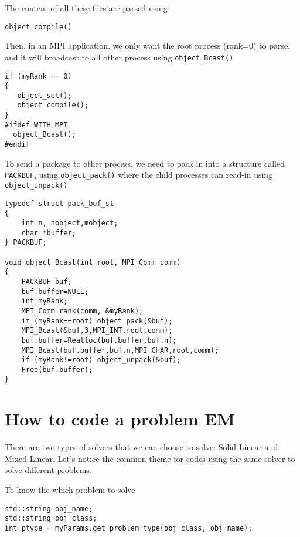 The content of all these files are parsed using
\begin{verbatim}
object_compile()
\end{verbatim}
Then, in an MPI application, we only want the root process (rank=0) to parse,
and it will broadcast to all other process using \verb!object_Bcast()!
\begin{verbatim}
if (myRank == 0)
{
   object_set();
   object_compile();
}
#ifdef WITH_MPI
  object_Bcast();
#endif
\end{verbatim}
To send a package to other process, we need to pack in into a structure called
\verb!PACKBUF!, using \verb!object_pack()! where the child processes can read-in
using \verb!object_unpack()!
\begin{verbatim}
typedef struct pack_buf_st
{
    int n, nobject,mobject;
    char *buffer;
} PACKBUF;

void object_Bcast(int root, MPI_Comm comm)
{
    PACKBUF buf;
    buf.buffer=NULL;
    int myRank;
    MPI_Comm_rank(comm, &myRank);
    if (myRank==root) object_pack(&buf);
    MPI_Bcast(&buf,3,MPI_INT,root,comm);
    buf.buffer=Realloc(buf.buffer,buf.n);
    MPI_Bcast(buf.buffer,buf.n,MPI_CHAR,root,comm);
    if (myRank!=root) object_unpack(&buf);
    Free(buf.buffer);
}
\end{verbatim}


  
\section{How to code a problem EM}
  
  
There are two types of solvers that we can choose to solve: Solid-Linear and 
Mixed-Linear. Let's notice the common theme for codes using the same solver to
solve different problems.

To know the which problem to solve
\begin{verbatim}
std::string obj_name;
std::string obj_class;
int ptype = myParams.get_problem_type(obj_class, obj_name);
\end{verbatim} 

